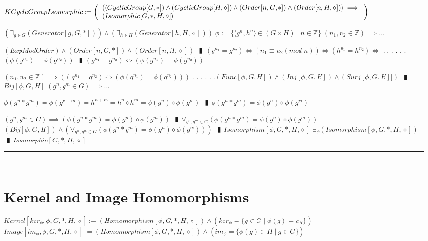 \documentclass{book}
\newcommand{\abr}{:=}
\newcommand{\cont}{\phantom{.}. . .\phantom{.}}
\newcommand{\pipe}{$\phantom{(}\vrectangleblack\phantom{)}$}
\newcommand{\pr}[1]{\left(#1\right)}
\newcommand{\st}{\mathbin{|}}
\begin{document}
$KCycleGroupIsomorphic \abr \left(\begin{array}{ll}
  \pr{(CyclicGroup[G, *]) \hfill \land \hfill (CyclicGroup[H, \diamond]) \hfill \land \hfill (Order[n, G, *]) \hfill \land \hfill (Order[n, H, \diamond])} \hfill \implies \hfill \\
  (Isomorphic[G, *, H, \diamond])
\end{array}\right)$
\begin{enumerate}
  \lit $\pr{\exists_{g \in G}(Generator[g, G, *])} \land \pr{\exists_{h \in H}(Generator[h, H, \diamond])}$
  \lit $\phi \abr \{\langle g^n, h^n \rangle \in (G \times H) \st n \in \mathbb{Z}\}$
  \lit $(n_1, n_2 \in \mathbb{Z}) \implies \ldots$
  \begin{enumerate}
    \lit $(ExpModOrder) \land (Order[n, G, *]) \land (Order[n, H, \diamond])$ \pipe $(g^{n_1} = g^{n_2}) \iff \pr{n_1 \equiv n_2 (mod \phantom{.} n)} \iff (h^{n_1} = h^{n_2}) \iff$ \cont
    \lit \cont $\pr{\phi(g^{n_1}) = \phi(g^{n_2})}$ \pipe $(g^{n_1} = g^{n_2}) \iff \pr{\phi(g^{n_1}) = \phi(g^{n_2})}$
  \end{enumerate}
  \lit $(n_1, n_2 \in \mathbb{Z}) \implies \pr{(g^{n_1} = g^{n_2}) \iff \pr{\phi(g^{n_1}) = \phi(g^{n_2})}}$ \cont
  \lit \cont $(Func[\phi, G, H]) \land (Inj[\phi, G, H]) \land (Surj[\phi, G, H]])$ \pipe $Bij[\phi, G, H]$ %
  \lit $(g^n, g^m \in G) \implies \ldots$
  \begin{enumerate}
    \lit $\phi(g^n * g^m) = \phi(g^{n + m}) = h^{n + m} = h^n \diamond h^m = \phi(g^n) \diamond \phi(g^m)$ \pipe $\phi(g^n * g^m) = \phi(g^n) \diamond \phi(g^m)$
  \end{enumerate}
  \lit $(g^n, g^m \in G) \implies \pr{\phi(g^n * g^m) = \phi(g^n) \diamond \phi(g^m)}$ \pipe $\forall_{g^n, g^m \in G}\pr{\phi(g^n * g^m) = \phi(g^n) \diamond \phi(g^m)}$
  \lit $(Bij[\phi, G, H]) \land \pr{\forall_{g^n, g^m \in G}\pr{\phi(g^n * g^m) = \phi(g^n) \diamond \phi(g^m)}}$ \pipe $Isomorphism[\phi, G, *, H, \diamond]$
  \lit $\exists_{\phi}(Isomorphism[\phi, G, *, H, \diamond])$ \pipe $Isomorphic[G, *, H, \diamond]$
\end{enumerate} \vspace{.75mm} \hrule \vspace{.75mm} \ \\ 

\section{Kernel and Image Homomorphisms}
$Kernel[ker_\phi, \phi, G, *, H, \diamond] \abr (Homomorphism[\phi, G, *, H, \diamond]) \land \pr{ker_\phi = \{g \in G \st \phi(g) = e_H\}}$ \\
$Image[im_\phi, \phi, G, *, H, \diamond] \abr (Homomorphism[\phi, G, *, H, \diamond]) \land \pr{im_\phi = \{\phi(g) \in H \st g \in G\}}$ \\
\end{document}
